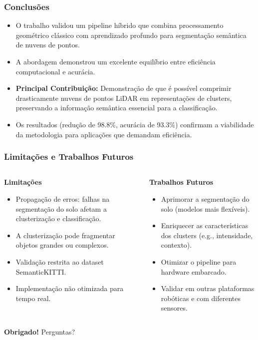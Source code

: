 \documentclass[aspectratio=169,t,xcolor=table]{beamer}
\begin{document}
\begin{frame}
    \frametitle{Conclusões}
    \begin{itemize}
        \item O trabalho validou um pipeline híbrido que combina processamento geométrico clássico com aprendizado profundo para segmentação semântica de nuvens de pontos.
        \item A abordagem demonstrou um excelente equilíbrio entre eficiência computacional e acurácia.
        \item \textbf{Principal Contribuição:} Demonstração de que é possível comprimir drasticamente nuvens de pontos LiDAR em representações de clusters, preservando a informação semântica essencial para a classificação.
        \item Os resultados (redução de 98.8\%, acurácia de 93.3\%) confirmam a viabilidade da metodologia para aplicações que demandam eficiência.
    \end{itemize}
\end{frame}

\begin{frame}
    \frametitle{Limitações e Trabalhos Futuros}
    \begin{columns}[T]
        \begin{column}{.5\textwidth}
            \textbf{Limitações}
            \begin{itemize}
                \item Propagação de erros: falhas na segmentação do solo afetam a clusterização e classificação.
                \item A clusterização pode fragmentar objetos grandes ou complexos.
                \item Validação restrita ao dataset SemanticKITTI.
                \item Implementação não otimizada para tempo real.
            \end{itemize}
        \end{column}
        \begin{column}{.5\textwidth}
            \textbf{Trabalhos Futuros}
            \begin{itemize}
                \item Aprimorar a segmentação do solo (modelos mais flexíveis).
                \item Enriquecer as características dos clusters (e.g., intensidade, contexto).
                \item Otimizar o pipeline para hardware embarcado.
                \item Validar em outras plataformas robóticas e com diferentes sensores.
            \end{itemize}
        \end{column}
    \end{columns}
\end{frame}

\begin{frame}
    \centering
    \huge{\textbf{Obrigado!}}
    \vspace{1cm}
    \Large{Perguntas?}
\end{frame}
\end{document}
